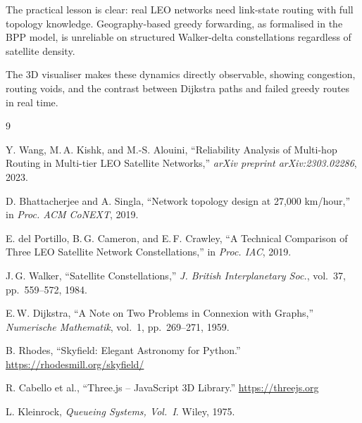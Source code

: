 \documentclass[12pt,a4paper]{report}
\begin{document}
The practical lesson is clear: real LEO networks need link-state routing with full
topology knowledge. Geography-based greedy forwarding, as formalised in the BPP
model, is unreliable on structured Walker-delta constellations regardless of satellite
density.

The 3D visualiser makes these dynamics directly observable, showing congestion,
routing voids, and the contrast between Dijkstra paths and failed greedy routes in
real time.


\begin{thebibliography}{9}

Y. Wang, M.\,A. Kishk, and M.-S. Alouini,
``Reliability Analysis of Multi-hop Routing in Multi-tier LEO Satellite Networks,''
\textit{arXiv preprint arXiv:2303.02286}, 2023.

D. Bhattacherjee and A. Singla,
``Network topology design at 27,000 km/hour,''
in \textit{Proc. ACM CoNEXT}, 2019.

E. del Portillo, B.\,G. Cameron, and E.\,F. Crawley,
``A Technical Comparison of Three LEO Satellite Network Constellations,''
in \textit{Proc. IAC}, 2019.

J.\,G. Walker, ``Satellite Constellations,''
\textit{J. British Interplanetary Soc.}, vol.~37, pp.~559--572, 1984.

E.\,W. Dijkstra,
``A Note on Two Problems in Connexion with Graphs,''
\textit{Numerische Mathematik}, vol.~1, pp.~269--271, 1959.

B. Rhodes, ``Skyfield: Elegant Astronomy for Python.''
\url{https://rhodesmill.org/skyfield/}

R. Cabello et al., ``Three.js -- JavaScript 3D Library.''
\url{https://threejs.org}

L. Kleinrock, \textit{Queueing Systems, Vol.~I}.
Wiley, 1975.

\end{thebibliography}
\end{document}
